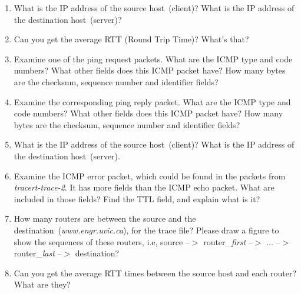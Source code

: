 \begin{enumerate}
\item What is the IP address of the source host~(client)? What is the IP address of the destination host~(server)?

\item  Can you get the average RTT (Round Trip Time)? What's that?

\item Examine one of the ping request packets. What are the ICMP type and code numbers? What other fields does this ICMP packet have? How many bytes are the checksum, sequence number and identifier fields?

\item Examine the corresponding ping reply packet. What are the ICMP type and code numbers? What other fields does this ICMP packet have? How many bytes are the checksum, sequence number and identifier fields?\\

\item What is the IP address of the source host~(client)? What is the IP address of the destination host~(server).


\item Examine the ICMP error packet, which could be found in the
  packets from \textit{tracert-trace-2}. It has more fields than the
  ICMP echo packet. What are included in those fields? Find the TTL
  field, and explain what is it?

\item How many routers are between the source and the destination~(\textsl{www.engr.uvic.ca}), for the trace file? Please draw a figure to show the sequences of these routers, i.e, source --$>$ router\_\textsl{first} --$>$ ... --$>$ router\_\textsl{last} --$>$ destination?

\item Can you get the average RTT times between the source host and each router? What are they?

\end{enumerate}

